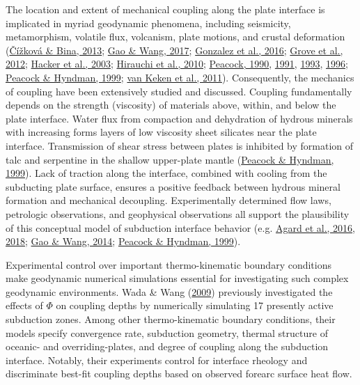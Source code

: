 The location and extent of mechanical coupling along the plate interface is implicated in myriad geodynamic phenomena, including seismicity, metamorphism, volatile flux, volcanism, plate motions, and crustal deformation (\protect\hyperlink{ref-cizkova2013}{Čížková \& Bina, 2013}; \protect\hyperlink{ref-gao2017}{Gao \& Wang, 2017}; \protect\hyperlink{ref-gonzalez2016}{Gonzalez et al., 2016}; \protect\hyperlink{ref-grove2012}{Grove et al., 2012}; \protect\hyperlink{ref-hacker2003}{Hacker et al., 2003}; \protect\hyperlink{ref-hirauchi2010}{Hirauchi et al., 2010}; \protect\hyperlink{ref-peacock1990}{Peacock, 1990}, \protect\hyperlink{ref-peacock1991}{1991}, \protect\hyperlink{ref-peacock1993}{1993}, \protect\hyperlink{ref-peacock1996}{1996}; \protect\hyperlink{ref-peacock1999a}{Peacock \& Hyndman, 1999}; \protect\hyperlink{ref-vankeken2011}{van Keken et al., 2011}). Consequently, the mechanics of coupling have been extensively studied and discussed. Coupling fundamentally depends on the strength (viscosity) of materials above, within, and below the plate interface. Water flux from compaction and dehydration of hydrous minerals with increasing  forms layers of low viscosity sheet silicates near the plate interface. Transmission of shear stress between plates is inhibited by formation of talc and serpentine in the shallow upper-plate mantle (\protect\hyperlink{ref-peacock1999a}{Peacock \& Hyndman, 1999}). Lack of traction along the interface, combined with cooling from the subducting plate surface, ensures a positive feedback between hydrous mineral formation and mechanical decoupling. Experimentally determined flow laws, petrologic observations, and geophysical observations all support the plausibility of this conceptual model of subduction interface behavior (e.g. \protect\hyperlink{ref-agard2016}{Agard et al., 2016}, \protect\hyperlink{ref-agard2018}{2018}; \protect\hyperlink{ref-gao2014}{Gao \& Wang, 2014}; \protect\hyperlink{ref-peacock1999a}{Peacock \& Hyndman, 1999}).

Experimental control over important thermo-kinematic boundary conditions make geodynamic numerical simulations essential for investigating such complex geodynamic environments. Wada \& Wang (\protect\hyperlink{ref-wada2009}{2009}) previously investigated the effects of \(\Phi\) on coupling depths by numerically simulating 17 presently active subduction zones. Among other thermo-kinematic boundary conditions, their models specify convergence rate, subduction geometry, thermal structure of oceanic- and overriding-plates, and degree of coupling along the subduction interface. Notably, their experiments control for interface rheology and discriminate best-fit coupling depths based on observed forearc surface heat flow.

